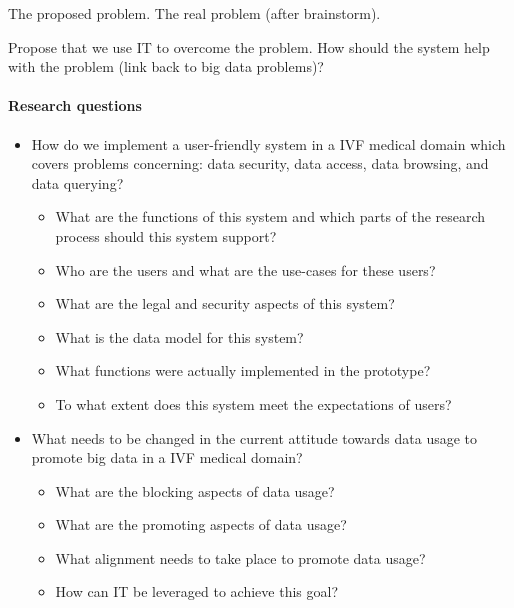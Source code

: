 The proposed problem.
The real problem (after brainstorm).

Propose that we use IT to overcome the problem.
How should the system help with the problem (link back to big data problems)?

\paragraph{Research questions}
\begin{itemize}
	\item How do we implement a user-friendly system in a IVF medical domain which covers problems concerning: data security, data access, data browsing, and data querying?
	\begin{itemize}
		\item What are the functions of this system and which parts of the research process should this system support?
		\item Who are the users and what are the use-cases for these users?
		\item What are the legal and security aspects of this system?
		\item What is the data model for this system?
		\item What functions were actually implemented in the prototype?
		\item To what extent does this system meet the expectations of users?
	\end{itemize}
	\item What needs to be changed in the current attitude towards data usage to promote big data in a IVF medical domain?
	\begin{itemize}
		\item What are the blocking aspects of data usage?
		\item What are the promoting aspects of data usage?
		\item What alignment needs to take place to promote data usage?
		\item How can IT be leveraged to achieve this goal?
	\end{itemize}
\end{itemize}

